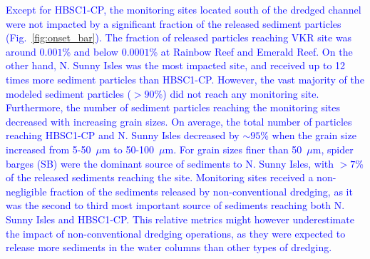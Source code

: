 \documentclass[preprint,12pt,authoryear]{elsarticle}
\newcommand{\modif}[1]{\textcolor{blue}{#1}}
\begin{document}
\modif{Except for HBSC1-CP, the monitoring sites located south of the dredged channel were not impacted by a significant fraction of the released sediment particles (Fig.~\ref{fig:onset_bar}). The fraction of released particles reaching VKR site was around $0.001$\% and below $0.0001$\% at Rainbow Reef and Emerald Reef. On the other hand, N. Sunny Isles was the most impacted site, and received up to 12 times more sediment particles than HBSC1-CP. However, the vast majority of the modeled sediment particles ($>90\%$) did not reach any monitoring site. Furthermore, the number of sediment particles reaching the monitoring sites decreased with increasing grain sizes. On average, the total number of particles reaching HBSC1-CP and N. Sunny Isles decreased by $\sim95$\% when the grain size increased from 5-50~$\mu$m to 50-100~$\mu$m. For grain sizes finer than 50~$\mu$m, spider barges (SB) were the dominant source of sediments to N. Sunny Isles, with $>7$\% of the released sediments reaching the site. Monitoring sites received a non-negligible fraction of the sediments released by non-conventional dredging, as it was the second to third most important source of sediments reaching both N. Sunny Isles and HBSC1-CP. This relative metrics might however underestimate the impact of non-conventional dredging operations, as they were expected to release more sediments in the water columns than other types of dredging.} 
\end{document}

